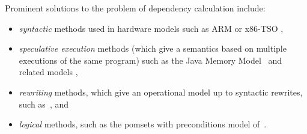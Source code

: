 Prominent solutions to the problem of dependency calculation include:
\begin{itemize}

\item \emph{syntactic} methods used in hardware models
  such as ARM or x86-TSO \cite{alglave},
\item \emph{speculative execution} methods (which give a semantics based on multiple executions
  of the same program) such as the Java Memory Model~\cite{Manson:2005:JMM:1047659.1040336} 
  and related models \cite{Jagadeesan:2010:GOS:2175486.2175503, DBLP:conf/popl/KangHLVD17, DBLP:journals/pacmpl/ChakrabortyV19},
\item \emph{rewriting} methods, which give an operational model
  up to syntactic rewrites, such as~\cite{Pichon-Pharabod:2016:CSR:2837614.2837616}, and
\item \emph{logical} methods, such as the pomsets with preconditions
  model of~\cite{DBLP:journals/pacmpl/JagadeesanJR20}.
  
\end{itemize}

